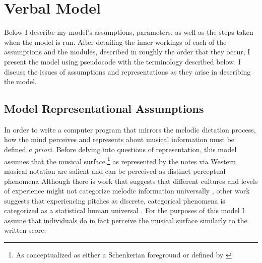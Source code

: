 \documentclass[]{book}
\let\rmarkdownfootnote\footnote%
\def\footnote{\protect\rmarkdownfootnote}
\begin{document}
\hypertarget{verbal-model}{%
\section{Verbal Model}\label{verbal-model}}

Below I describe my model's assumptions, parameters, as well as the steps taken when the model is run.
After detailing the inner workings of each of the assumptions and the modules, described in roughly the order that they occur, I present the model using pseudocode with the terminology described below.
I discuss the issues of assumptions and representations as they arise in describing the model.

\hypertarget{model-representational-assumptions}{%
\subsection{Model Representational Assumptions}\label{model-representational-assumptions}}

In order to write a computer program that mirrors the melodic dictation process, how the mind perceives and represents about musical information must be defined \emph{a priori}.
Before delving into questions of representation, this model assumes that the musical surface.\footnote{As conceptualized as either a Schenkerian foreground \citep{schenkerFreieSatz1935} or defined by \citet{lerdahlGenerativeTheoryTonal1986}} as represented by the notes via Western musical notation are salient and can be perceived as distinct perceptual phenomena
Although there is work that suggests that different cultures and levels of experience might not categorize melodic information universally \citep{mcdermottIndifferenceDissonanceNative2016}, other work suggests that experiencing pitches as discrete, categorical phenomena is categorized as a statistical human universal \citep{savageStatisticalUniversalsReveal2015}.
For the purposes of this model I assume that individuals do in fact perceive the musical surface similarly to the written score.
\end{document}
